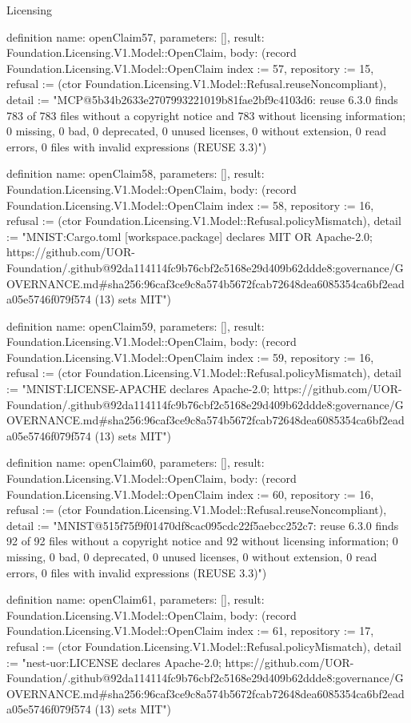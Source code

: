 \begin{lexlean}{Licensing}
\begin{semanticmodule}
definition{
  name: openClaim57,
  parameters: [],
  result: Foundation.Licensing.V1.Model::OpenClaim,
  body: (record Foundation.Licensing.V1.Model::OpenClaim {index := 57, repository := 15, refusal := (ctor Foundation.Licensing.V1.Model::Refusal.reuseNoncompliant), detail := "MCP@5b34b2633e2707993221019b81fae2bf9c4103d6: reuse 6.3.0 finds 783 of 783 files without a copyright notice and 783 without licensing information; 0 missing, 0 bad, 0 deprecated, 0 unused licenses, 0 without extension, 0 read errors, 0 files with invalid expressions (REUSE 3.3)"})
}

definition{
  name: openClaim58,
  parameters: [],
  result: Foundation.Licensing.V1.Model::OpenClaim,
  body: (record Foundation.Licensing.V1.Model::OpenClaim {index := 58, repository := 16, refusal := (ctor Foundation.Licensing.V1.Model::Refusal.policyMismatch), detail := "MNIST:Cargo.toml [workspace.package] declares MIT OR Apache-2.0; https://github.com/UOR-Foundation/.github@92da114114fc9b76cbf2c5168e29d409b62ddde8:governance/GOVERNANCE.md#sha256:96caf3ce9c8a574b5672fcab72648dea6085354ca6bf2eada05e5746f079f574 (13) sets MIT"})
}

definition{
  name: openClaim59,
  parameters: [],
  result: Foundation.Licensing.V1.Model::OpenClaim,
  body: (record Foundation.Licensing.V1.Model::OpenClaim {index := 59, repository := 16, refusal := (ctor Foundation.Licensing.V1.Model::Refusal.policyMismatch), detail := "MNIST:LICENSE-APACHE declares Apache-2.0; https://github.com/UOR-Foundation/.github@92da114114fc9b76cbf2c5168e29d409b62ddde8:governance/GOVERNANCE.md#sha256:96caf3ce9c8a574b5672fcab72648dea6085354ca6bf2eada05e5746f079f574 (13) sets MIT"})
}

definition{
  name: openClaim60,
  parameters: [],
  result: Foundation.Licensing.V1.Model::OpenClaim,
  body: (record Foundation.Licensing.V1.Model::OpenClaim {index := 60, repository := 16, refusal := (ctor Foundation.Licensing.V1.Model::Refusal.reuseNoncompliant), detail := "MNIST@515f75f9f01470df8cac095cdc22f5aebcc252c7: reuse 6.3.0 finds 92 of 92 files without a copyright notice and 92 without licensing information; 0 missing, 0 bad, 0 deprecated, 0 unused licenses, 0 without extension, 0 read errors, 0 files with invalid expressions (REUSE 3.3)"})
}

definition{
  name: openClaim61,
  parameters: [],
  result: Foundation.Licensing.V1.Model::OpenClaim,
  body: (record Foundation.Licensing.V1.Model::OpenClaim {index := 61, repository := 17, refusal := (ctor Foundation.Licensing.V1.Model::Refusal.policyMismatch), detail := "nest-uor:LICENSE declares Apache-2.0; https://github.com/UOR-Foundation/.github@92da114114fc9b76cbf2c5168e29d409b62ddde8:governance/GOVERNANCE.md#sha256:96caf3ce9c8a574b5672fcab72648dea6085354ca6bf2eada05e5746f079f574 (13) sets MIT"})
}


\end{semanticmodule}
\end{lexlean}
